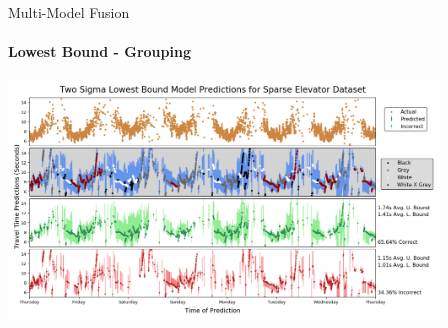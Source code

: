 \documentclass{beamer}
\begin{document}
\begin{frame}[t]{Multi-Model Fusion}
  \framesubtitle{Lowest Bound - Grouping}

  {\includegraphics[width = 4.5in]{images/redux/two_sigma_lowest_bound_model_predictions_for_sparse_elevator_dataset.png}}

\end{frame}
\end{document}

